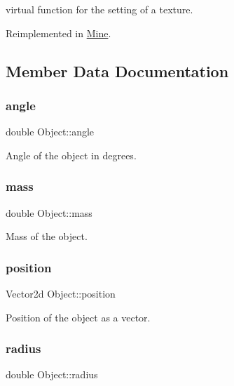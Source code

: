 virtual function for the setting of a texture. 

Reimplemented in \hyperlink{classMine_a56c9fa642d918b17cb20a800e66423cb}{Mine}.



\subsection{Member Data Documentation}
\hypertarget{classObject_aa08efab6c2c6898b1d0d7103076d8674}{}\label{classObject_aa08efab6c2c6898b1d0d7103076d8674} 
\subsubsection{\texorpdfstring{angle}{angle}}
{\footnotesize\ttfamily double Object\+::angle\hspace{0.3cm}{\ttfamily [protected]}}

Angle of the object in degrees. \hypertarget{classObject_abbd565f533683168a39d703f3b5c6bae}{}\label{classObject_abbd565f533683168a39d703f3b5c6bae} 
\subsubsection{\texorpdfstring{mass}{mass}}
{\footnotesize\ttfamily double Object\+::mass\hspace{0.3cm}{\ttfamily [protected]}}

Mass of the object. \hypertarget{classObject_ab77f145878370ab7b92f067432dc375c}{}\label{classObject_ab77f145878370ab7b92f067432dc375c} 
\subsubsection{\texorpdfstring{position}{position}}
{\footnotesize\ttfamily Vector2d Object\+::position\hspace{0.3cm}{\ttfamily [protected]}}

Position of the object as a vector. \hypertarget{classObject_aacfbf5151daad699c60efc27fb702406}{}\label{classObject_aacfbf5151daad699c60efc27fb702406} 
\subsubsection{\texorpdfstring{radius}{radius}}
{\footnotesize\ttfamily double Object\+::radius\hspace{0.3cm}{\ttfamily [protected]}}

